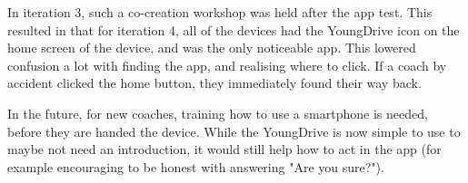 In iteration 3, such a co-creation workshop was held after the app test. This resulted in that for iteration 4, all of the devices had the YoungDrive icon on the home screen of the device, and was the only noticeable app. This lowered confusion a lot with finding the app, and realising where to click. If a coach by accident clicked the home button, they immediately found their way back.

In the future, for new coaches, training how to use a smartphone is needed, before they are handed the device. While the YoungDrive is now simple to use to maybe not need an introduction, it would still help how to act in the app (for example encouraging to be honest with answering "Are you sure?").
